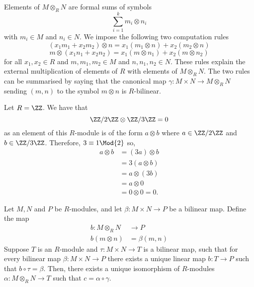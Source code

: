 \documentclass[12pt, a4paper]{article}
\begin{document}
\begin{mdnote}
    Elements of \( M \otimes_R N \) are formal sums of symbols
\[
\sum_{i=1}^{k} m_i \otimes n_i
\]
with \( m_i \in M \) and \( n_i \in N \). We impose the following two computation rules
\[
(x_1m_1 + x_2m_2) \otimes n = x_1(m_1 \otimes n) + x_2(m_2 \otimes n)
\]
\[
m \otimes (x_1n_1 + x_2n_2) = x_1(m \otimes n_1) + x_2(m \otimes n_2)
\]
for all \( x_1, x_2 \in R \) and \( m, m_1, m_2 \in M \) and \( n, n_1, n_2 \in N \). These rules explain the external multiplication of elements of \( R \) with elements of \( M \otimes_R N \). The two rules can be summarised by saying that the canonical map \( \gamma : M \times N \to M \otimes_R N \) sending \( (m, n) \) to the symbol \( m \otimes n \) is \( R \)-bilinear.
\end{mdnote}

\begin{mdexample}
    Let \(R=\ZZ\). We have that 
    \[\ZZ/2\ZZ \otimes \ZZ/3\ZZ=0\]
    as an element of this \(R\)-module is of the form \(a\otimes b\) where \(a \in \ZZ/2\ZZ\) and \(b\in \ZZ/3\ZZ\). Therefore, \(3\equiv 1\Mod{2}\) so,
    \[\begin{aligned}
        a \otimes b &= (3a)\otimes b \\
        &= 3(a\otimes b) \\
        &= a\otimes (3b) \\
        &= a\otimes 0 \\
        &= 0\otimes 0 =0.
    \end{aligned}\]
\end{mdexample}

\begin{mdthm}
    Let \( M, N \) and \( P \) be \( R \)-modules, and let \( \beta : M \times N \to P \) be a bilinear map. Define the map
    \[\begin{aligned}
        b : M \otimes_R N &\to P \\
        b(m \otimes n) &= \beta(m, n) 
    \end{aligned}\]
    Suppose \( T \) is an \( R \)-module and \( \tau : M \times N \to T \) is a bilinear map, such that for every bilinear map \( \beta : M \times N \to P \) there exists a unique linear map \( b : T \to P \) such that \( b \circ \tau = \beta \). Then, there exists a unique isomorphism of \( R \)-modules \( \alpha : M \otimes_R N \to T \) such that \( c = \alpha \circ \gamma \).
\end{mdthm}
\end{document}

